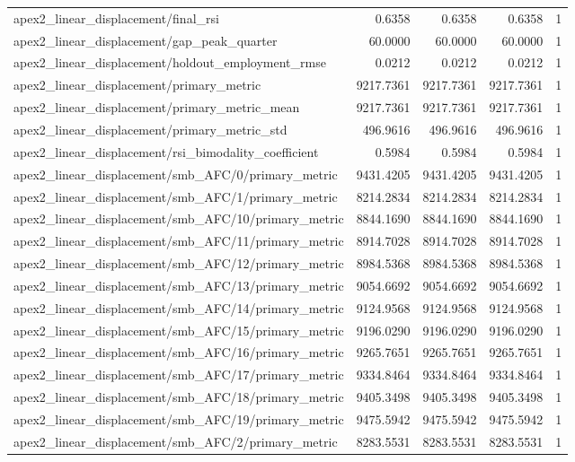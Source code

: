 \begin{table}[h]
\begin{tabular}{lrrrr}
apex2_linear_displacement/final_rsi & 0.6358 & 0.6358 & 0.6358 & 1 \\
apex2_linear_displacement/gap_peak_quarter & 60.0000 & 60.0000 & 60.0000 & 1 \\
apex2_linear_displacement/holdout_employment_rmse & 0.0212 & 0.0212 & 0.0212 & 1 \\
apex2_linear_displacement/primary_metric & 9217.7361 & 9217.7361 & 9217.7361 & 1 \\
apex2_linear_displacement/primary_metric_mean & 9217.7361 & 9217.7361 & 9217.7361 & 1 \\
apex2_linear_displacement/primary_metric_std & 496.9616 & 496.9616 & 496.9616 & 1 \\
apex2_linear_displacement/rsi_bimodality_coefficient & 0.5984 & 0.5984 & 0.5984 & 1 \\
apex2_linear_displacement/smb_AFC/0/primary_metric & 9431.4205 & 9431.4205 & 9431.4205 & 1 \\
apex2_linear_displacement/smb_AFC/1/primary_metric & 8214.2834 & 8214.2834 & 8214.2834 & 1 \\
apex2_linear_displacement/smb_AFC/10/primary_metric & 8844.1690 & 8844.1690 & 8844.1690 & 1 \\
apex2_linear_displacement/smb_AFC/11/primary_metric & 8914.7028 & 8914.7028 & 8914.7028 & 1 \\
apex2_linear_displacement/smb_AFC/12/primary_metric & 8984.5368 & 8984.5368 & 8984.5368 & 1 \\
apex2_linear_displacement/smb_AFC/13/primary_metric & 9054.6692 & 9054.6692 & 9054.6692 & 1 \\
apex2_linear_displacement/smb_AFC/14/primary_metric & 9124.9568 & 9124.9568 & 9124.9568 & 1 \\
apex2_linear_displacement/smb_AFC/15/primary_metric & 9196.0290 & 9196.0290 & 9196.0290 & 1 \\
apex2_linear_displacement/smb_AFC/16/primary_metric & 9265.7651 & 9265.7651 & 9265.7651 & 1 \\
apex2_linear_displacement/smb_AFC/17/primary_metric & 9334.8464 & 9334.8464 & 9334.8464 & 1 \\
apex2_linear_displacement/smb_AFC/18/primary_metric & 9405.3498 & 9405.3498 & 9405.3498 & 1 \\
apex2_linear_displacement/smb_AFC/19/primary_metric & 9475.5942 & 9475.5942 & 9475.5942 & 1 \\
apex2_linear_displacement/smb_AFC/2/primary_metric & 8283.5531 & 8283.5531 & 8283.5531 & 1 \\

\end{tabular}
\end{table}
